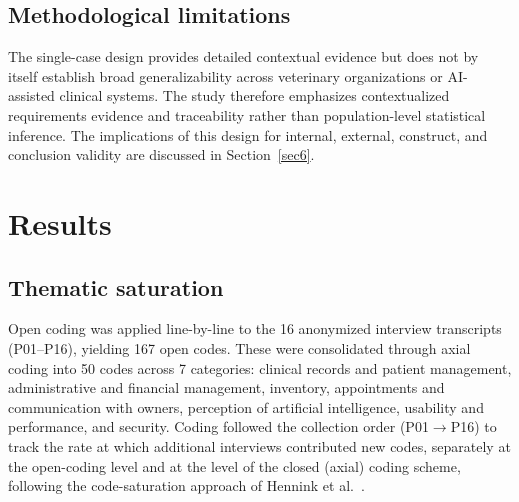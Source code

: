 \documentclass[pdflatex,sn-mathphys-num,Numbered]{sn-jnl}
\begin{document}
\subsection{Methodological limitations}\label{subsec9}

The single-case design provides detailed contextual evidence but does not by itself establish broad generalizability across veterinary organizations or AI-assisted clinical systems. The study therefore emphasizes contextualized requirements evidence and traceability rather than population-level statistical inference. The implications of this design for internal, external, construct, and conclusion validity are discussed in Section~\ref{sec6}.


\section{Results}\label{sec4}

\subsection{Thematic saturation}\label{res:saturation}

Open coding was applied line-by-line to the 16 anonymized interview transcripts (P01--P16), yielding 167 open codes. These were consolidated through axial coding into 50 codes across 7 categories: clinical records and patient management, administrative and financial management, inventory, appointments and communication with owners, perception of artificial intelligence, usability and performance, and security. Coding followed the collection order (P01$\rightarrow$P16) to track the rate at which additional interviews contributed new codes, separately at the open-coding level and at the level of the closed (axial) coding scheme, following the code-saturation approach of Hennink et al.~\cite{hennink2017}.
\end{document}
